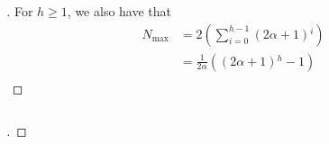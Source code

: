 \begin{frame}[allowframebreaks]
    \begin{columns}
        \begin{column}{0.4\textwidth}
            \begin{block}{}
                \begin{proof}[\unskip\nopunct]\renewcommand{\qedsymbol}{}
                    For \(h \geq 1\), we also have that
                    \[
                        \begin{aligned}
                            N_{\text{max}} &= 2\left(\sum^{h - 1}_{i = 0} \left(2\alpha + 1\right){}^i \right) \\
                            &= \frac{1}{2\alpha}\left(\left(2\alpha + 1\right){}^{h} - 1\right) \\
                        \end{aligned}
                    \]
                \end{proof}
            \end{block}
        \end{column}
    \end{columns}
    \begin{columns}
        \begin{column}{\textlecolumn}
            \begin{block}{}
                \begin{proof}[\unskip\nopunct]

\end{proof}
\end{block}
\end{column}
\end{columns}
\end{frame}
